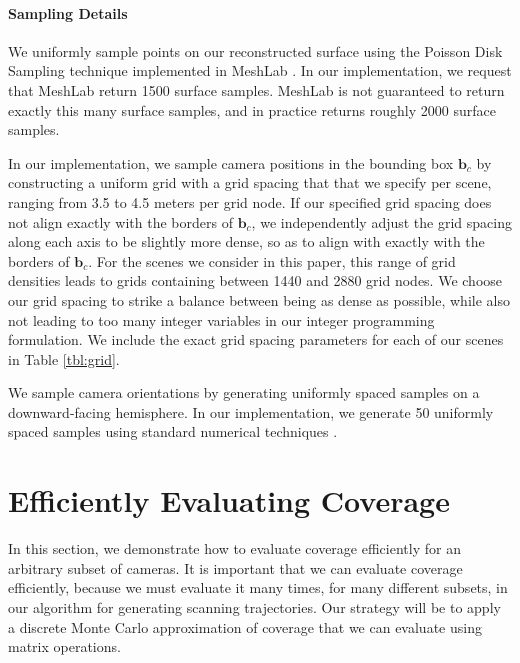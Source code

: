\vspace{-12pt}
\paragraph{Sampling Details}
We uniformly sample points on our reconstructed surface using the Poisson Disk Sampling technique \cite{corsini:2012} implemented in MeshLab \cite{cignoni:2008}.
In our implementation, we request that MeshLab return 1500 surface samples.
MeshLab is not guaranteed to return exactly this many surface samples, and in practice returns roughly 2000 surface samples.

In our implementation, we sample camera positions in the bounding box $\mathbf{b}_c$ by constructing a uniform grid with a grid spacing that that we specify per scene, ranging from 3.5 to 4.5 meters per grid node.
If our specified grid spacing does not align exactly with the borders of $\mathbf{b}_c$, we independently adjust the grid spacing along each axis to be slightly more dense, so as to align with exactly with the borders of $\mathbf{b}_c$.
For the scenes we consider in this paper, this range of grid densities leads to grids containing between 1440 and 2880 grid nodes.
We choose our grid spacing to strike a balance between being as dense as possible, while also not leading to too many integer variables in our integer programming formulation. We include the exact grid spacing parameters for each of our scenes in Table \ref{tbl:grid}.

We sample camera orientations by generating uniformly spaced samples on a downward-facing hemisphere.
In our implementation, we generate 50 uniformly spaced samples using standard numerical techniques \cite{devert:2012}.

\vspace{-0pt}
\section{Efficiently Evaluating Coverage}
\label{sec:evaluating_coverage}

In this section, we demonstrate how to evaluate coverage efficiently for an arbitrary subset of cameras. 
It is important that we can evaluate coverage efficiently, because we must evaluate it many times, for many different subsets, in our algorithm for generating scanning trajectories.
Our strategy will be to apply a discrete Monte Carlo approximation of coverage that we can evaluate using matrix operations. 

\vspace{-12pt}
